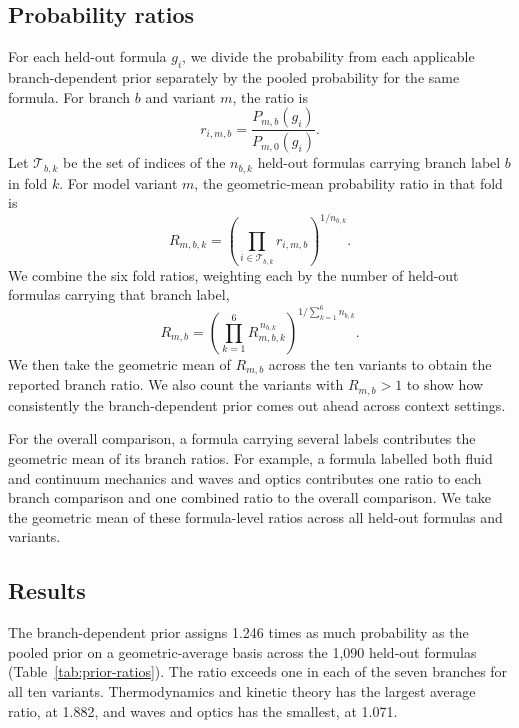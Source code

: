 \documentclass[10pt]{article}
\begin{document}
\subsection{Probability ratios}
For each held-out formula $g_i$, we divide the probability from each applicable branch-dependent prior separately by the pooled probability for the same formula. For branch $b$ and variant $m$, the ratio is
\begin{equation}
r_{i,m,b}=\frac{P_{m,b}(g_i)}{P_{m,0}(g_i)}.
\label{eq:formula-ratio}
\end{equation}
Let $\mathcal{T}_{b,k}$ be the set of indices of the $n_{b,k}$ held-out formulas carrying branch label $b$ in fold $k$. For model variant $m$, the geometric-mean probability ratio in that fold is
\begin{equation}
R_{m,b,k}=\left(\prod_{i\in\mathcal{T}_{b,k}}r_{i,m,b}\right)^{1/n_{b,k}}.
\label{eq:fold-prior-ratio}
\end{equation}
We combine the six fold ratios, weighting each by the number of held-out formulas carrying that branch label,
\begin{equation}
R_{m,b}=
\left(\prod_{k=1}^{6}R_{m,b,k}^{\,n_{b,k}}\right)^{1/\sum_{k=1}^{6}n_{b,k}}.
\label{eq:variant-branch-ratio}
\end{equation}
We then take the geometric mean of $R_{m,b}$ across the ten variants to obtain the reported branch ratio. We also count the variants with $R_{m,b}>1$ to show how consistently the branch-dependent prior comes out ahead across context settings.

For the overall comparison, a formula carrying several labels contributes the geometric mean of its branch ratios. For example, a formula labelled both fluid and continuum mechanics and waves and optics contributes one ratio to each branch comparison and one combined ratio to the overall comparison. We take the geometric mean of these formula-level ratios across all held-out formulas and variants.

\subsection{Results}
The branch-dependent prior assigns 1.246 times as much probability as the pooled prior on a geometric-average basis across the 1,090 held-out formulas (Table~\ref{tab:prior-ratios}). The ratio exceeds one in each of the seven branches for all ten variants. Thermodynamics and kinetic theory has the largest average ratio, at 1.882, and waves and optics has the smallest, at 1.071.
\end{document}
